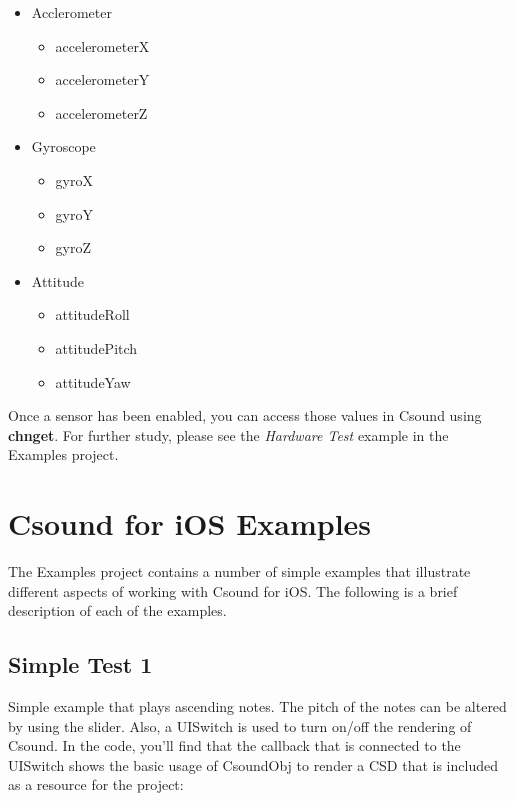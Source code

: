 \documentclass[11pt]{article}
\begin{document}
\begin{itemize}

\item Acclerometer
\begin{itemize}
\item accelerometerX
\item accelerometerY
\item accelerometerZ
\end{itemize}

\item Gyroscope 
\begin{itemize}
\item gyroX
\item gyroY
\item gyroZ
\end{itemize}

\item Attitude 
\begin{itemize}
\item attitudeRoll
\item attitudePitch
\item attitudeYaw
\end{itemize}

\end{itemize} 

Once a sensor has been enabled, you can access those values in Csound using \textbf{chnget}. For further study, please see the \emph{Hardware Test} example in the Examples project. 


\section{Csound for iOS Examples}

The Examples project contains a number of simple examples that illustrate different aspects of working with Csound for iOS.  The following is a brief description of each of the examples.

\subsection{Simple Test 1}

Simple example that plays ascending notes.  The pitch of the notes can be altered by using the slider.  Also, a UISwitch is used to turn on/off the rendering of Csound.  In the code, you'll find that the callback that is connected to the UISwitch shows the basic usage of CsoundObj to render a CSD that is included as a resource for the project:
\end{document}
